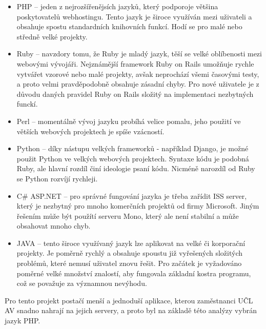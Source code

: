             \begin{itemize}
                \item PHP – jeden z nejrozšířenějsích jazyků, který podporoje většina poskytovatelů webhostingu. Tento jazyk je široce využíván mezi uživateli a obsahuje spostu standardních knihovních funkcí. Hodí se pro malé nebo středně velké projekty.
                \item Ruby – navzdory tomu, že Ruby je mladý jazyk, těší se velké oblíbenosti mezi webovými vývojáři. Nejznámější framework Ruby on Rails umožňuje rychle vytvářet vzorové nebo malé projekty, avšak neprochází všemi časovými testy, a proto velmi pravděpodobně obsahuje zásadní chyby. Pro nové uživatele je z důvodu daných pravidel Ruby on Rails složitý na implementaci nezbytných funckí.
                \item Perl – momentálně vývoj jazyku probíhá velice pomalu, jeho použití ve větších webových projektech je spíše vzácností.
                \item Python – díky nástupu velkých frameworků - například Django, je možné použit Python ve velkých webových projektech. Syntaxe kódu je podobná Ruby, ale hlavní rozdíl činí ideologie psaní kódu. Nicméně narozdíl od Ruby se Python rozvíjí rychleji.
                \item C\# ASP.NET – pro správné fungování jazyka je třeba zařídit ISS server, který je nezbytný pro mnoho komerčních projektů od firmy Microsoft. Jiným řešením může být použítí serveru Mono, který ale není stabilní a může obsahovat mnoho chyb.
                \item JAVA – tento široce využívaný jazyk lze aplikovat na velké či korporační projekty. Je poměrně rychlý a obsahuje spoustu již vyřešených složitých problémů, které nemusí uživatel znovu řešit. Pro začátek je vyžadováno poměrné velké množství znalostí, aby fungovala základní kostra programu, což se považuje za významnou nevýhodu.
            \end{itemize}
            
            Pro tento projekt postačí menší a jednoduší aplikace, kterou zaměstnanci UČL AV snadno nahrají na jejich servery, a proto byl na základě této analýzy vybrán jazyk PHP.
            
